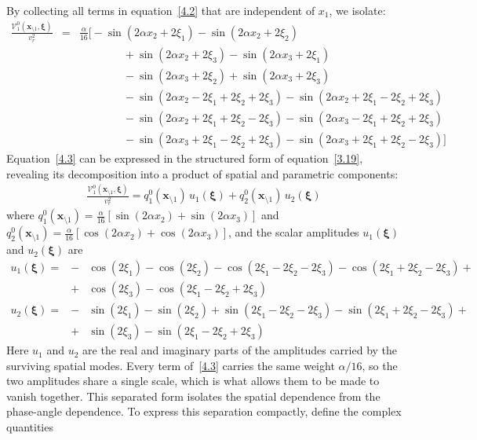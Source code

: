 \documentclass[11pt]{jfm}
\numberwithin{equation}{section}
\begin{document}
By collecting all terms in equation~\eqref{4.2} that are independent of $x_1$, we isolate:
\begin{eqnarray}
\label{4.3}
\frac{\mathcal{V}_1^0(\boldsymbol{x}_{\setminus 1}, \boldsymbol{\xi})}{v_r^2} &=& \frac{\alpha}{16}\Big[-\sin(2\alpha x_2+2\xi_1) -\sin(2\alpha x_2+2\xi_2)
\nonumber\\ && \qquad\qquad +\sin(2\alpha x_2+2\xi_3) -\sin(2\alpha x_3+2\xi_1)
\nonumber\\ && \qquad\qquad -\sin(2\alpha x_3+2\xi_2) +\sin(2\alpha x_3+2\xi_3)
\nonumber\\ && \qquad\qquad -\sin(2\alpha x_2-2\xi_1+2\xi_2+2\xi_3) -\sin(2\alpha x_2+2\xi_1-2\xi_2+2\xi_3)
\nonumber\\ && \qquad\qquad -\sin(2\alpha x_2+2\xi_1+2\xi_2-2\xi_3) -\sin(2\alpha x_3-2\xi_1+2\xi_2+2\xi_3)
\nonumber\\ && \qquad\qquad -\sin(2\alpha x_3+2\xi_1-2\xi_2+2\xi_3) -\sin(2\alpha x_3+2\xi_1+2\xi_2-2\xi_3)\Big]
\end{eqnarray}
Equation~\eqref{4.3} can be expressed in the structured form of equation~\eqref{3.19}, revealing its decomposition into a product of spatial and parametric components:
\begin{eqnarray}
\label{4.4}
\frac{\mathcal{V}_1^0(\boldsymbol{x}_{\setminus 1}, \boldsymbol{\xi})}{v_r^2} = q_1^0(\boldsymbol{x}_{\setminus 1})\, u_1(\boldsymbol{\xi})+q_2^0(\boldsymbol{x}_{\setminus 1})\, u_2(\boldsymbol{\xi})
\end{eqnarray}
where $q_1^0(\boldsymbol{x}_{\setminus 1})=\frac{\alpha}{16} \left[\sin(2\alpha x_2)+\sin(2\alpha x_3)\right]$ and $q_2^0(\boldsymbol{x}_{\setminus 1})=\frac{\alpha}{16} \left[\cos(2\alpha x_2)+\cos(2\alpha x_3)\right]$, and the scalar amplitudes $u_1(\boldsymbol{\xi})$ and $u_2(\boldsymbol{\xi})$ are
\begin{eqnarray}
\label{4.5}
u_1(\boldsymbol{\xi}) = &-&\cos(2\xi_1) - \cos(2\xi_2) - \cos(2\xi_1 - 2\xi_2 - 2\xi_3) - \cos(2\xi_1 + 2\xi_2 - 2\xi_3)+ \nonumber\\
&+&\cos(2\xi_3)- \cos(2\xi_1 - 2\xi_2 + 2\xi_3)
\end{eqnarray}
\begin{eqnarray}
\label{4.6}
u_2(\boldsymbol{\xi})= &-&\sin(2\xi_1) - \sin(2\xi_2) + \sin(2\xi_1 - 2\xi_2 - 2\xi_3) - \sin(2\xi_1 + 2\xi_2 - 2\xi_3)+ \nonumber\\
&+&\sin(2\xi_3)- \sin(2\xi_1 - 2\xi_2 + 2\xi_3)
\end{eqnarray}
Here $u_1$ and $u_2$ are the real and imaginary parts of the amplitudes carried by the surviving spatial modes. Every term of~\eqref{4.3} carries the same weight $\alpha/16$, so the two amplitudes share a single scale, which is what allows them to be made to vanish together. This separated form isolates the spatial dependence from the phase-angle dependence. To express this separation compactly, define the complex quantities
\end{document}
